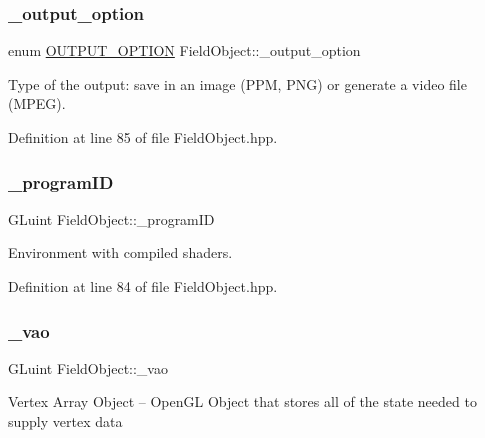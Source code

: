 \mbox{\label{class_field_object_ac389b983df486fe3eac03de5825d1a35}} 
\subsubsection{\texorpdfstring{\+\_\+output\+\_\+option}{\_output\_option}}
{\footnotesize\ttfamily enum \hyperlink{offscreen_8h_a29ac838d689ab5ed87b591138936e615}{O\+U\+T\+P\+U\+T\+\_\+\+O\+P\+T\+I\+ON} Field\+Object\+::\+\_\+output\+\_\+option\hspace{0.3cm}{\ttfamily [protected]}}

Type of the output\+: save in an image (P\+PM, P\+NG) or generate a video file (M\+P\+EG). 

Definition at line 85 of file Field\+Object.\+hpp.

\mbox{\label{class_field_object_a6c5c454cefffe4c094bb2e015c2f1cae}} 
\subsubsection{\texorpdfstring{\+\_\+program\+ID}{\_programID}}
{\footnotesize\ttfamily G\+Luint Field\+Object\+::\+\_\+program\+ID\hspace{0.3cm}{\ttfamily [protected]}}

Environment with compiled shaders. 

Definition at line 84 of file Field\+Object.\+hpp.

\mbox{\label{class_field_object_ae6ae1217e025ba7aaf4de62edb227d88}} 
\subsubsection{\texorpdfstring{\+\_\+vao}{\_vao}}
{\footnotesize\ttfamily G\+Luint Field\+Object\+::\+\_\+vao\hspace{0.3cm}{\ttfamily [protected]}}

Vertex Array Object -- Open\+GL Object that stores all of the state needed to supply vertex data 

